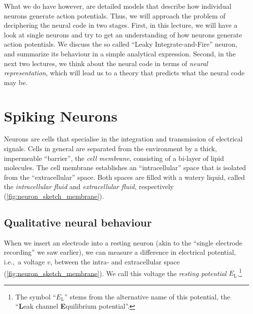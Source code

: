 \documentclass[10pt,letterpaper,oneside]{article}
\begin{document}

What we do have however, are detailed models that describe how individual neurons generate action potentials. Thus, we will approach the problem of deciphering the neural code in two stages. First, in this lecture, we will have a look at single neurons and try to get an understanding of how neurons generate action potentials. We discuss the so called \enquote{Leaky Integrate-and-Fire} neuron, and summarize its behaviour in a simple analytical expression. Second, in the next two lectures, we think about the neural code in terms of \emph{neural representation}, which will lead us to a theory that predicts what the neural code may be.

\section{Spiking Neurons}


Neurons are cells that specialise in the integration and transmission of electrical signals. Cells in general are separated from the environment by a thick, impermeable \enquote{barrier}, the \emph{cell membrane}, consisting of a bi-layer of lipid molecules. The cell membrane establishes an \enquote{intracellular} space that is isolated from the \enquote{extracellular} space. Both spaces are filled with a watery liquid, called the \emph{intracellular fluid} and \emph{extracellular fluid}, respectively (\cref{fig:neuron_sketch_membrane}).

\subsection{Qualitative neural behaviour}

When we insert an electrode into a resting neuron (akin to the \enquote{single electrode recording} we saw earlier), we can measure a difference in electrical potential, i.e.,~a voltage $v$, between the intra- and extracellular space (\cref{fig:neuron_sketch_membrane}). We call this voltage the \emph{resting potential} $E_\mathrm{L}$.\footnote{The symbol \enquote{$E_\mathrm{L}$} stems from the alternative name of this potential, the \enquote{\textbf{L}eak channel \textbf{E}quilibrium potential}.}
\end{document}
